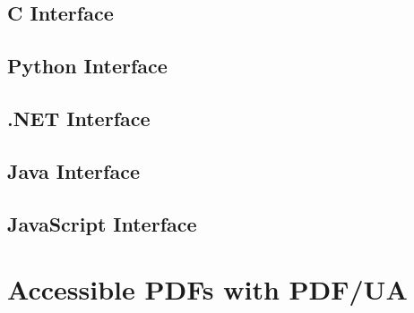 \documentclass{book}
\begin{document}
\fi%

\begin{cpdflib}
\clearpage
\section*{C Interface}
\begin{small}\tt

\end{small}
\end{cpdflib}

\begin{pycpdflib}
\clearpage
\section*{Python Interface}
\begin{small}\tt

\end{small}
\end{pycpdflib}

\begin{dotnetcpdflib}
\clearpage
\section*{.NET Interface}
\begin{small}\tt

\end{small}
\end{dotnetcpdflib}

\begin{jcpdflib}
\clearpage
\section*{Java Interface}
\begin{small}\tt

\end{small}
\end{jcpdflib}

\begin{jscpdflib}
\clearpage
\section*{JavaScript Interface}
\begin{small}\tt

\end{small}
\end{jscpdflib}

\clearpage\pagestyle{empty}
\chapter{Accessible PDFs with PDF/UA}\label{chap:19}\pagestyle{fancy}
\end{document}
